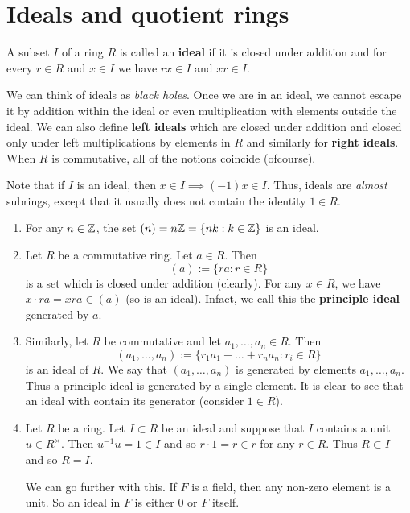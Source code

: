 \chapter{Ideals and quotient rings}

\begin{definition}[Ideal]
    A subset $I$ of a ring $R$ is called an \textbf{ideal} if it is closed under addition and for every $r \in R$ and $x \in I$ we have $rx \in I$ and $xr \in I$.
\end{definition}

We can think of ideals as \emph{black holes}. Once we are in an ideal, we cannot escape it by addition within the ideal or even multiplication with elements outside the ideal. We can also define \textbf{left ideals} which are closed under addition and closed only under left multiplications by elements in $R$ and similarly for \textbf{right ideals}. When $R$ is commutative, all of the notions coincide (ofcourse). 

\begin{remark}
    Note that if $I$ is an ideal, then $x \in I \implies (-1)x \in I$. Thus, ideals are \emph{almost} subrings, except that it usually does not contain the identity $1 \in R$.
\end{remark}

\begin{example}
    \begin{enumerate}
        \item For any $n \in \mathbb{Z}$, the set $(n) = n\mathbb{Z} = \{nk : k \in \mathbb{Z}\}$ is an ideal.

        \item Let $R$ be a commutative ring. Let $a \in R$. Then
            \[ (a) := \{ra : r \in R\} \]
            is a set which is closed under addition (clearly). For any $x \in R$, we have $x \cdot ra = xra \in (a)$ (so is an ideal). Infact, we call this the \textbf{principle ideal} generated by $a$.

        \item Similarly, let $R$ be commutative and let $a_1, \ldots, a_n \in R$. Then 
            \[ (a_1, \ldots, a_n) := \{ r_1a_1 + \ldots + r_na_n : r_i \in R \} \]
            is an ideal of $R$. We say that $(a_1, \ldots, a_n)$ is generated by elements $a_1, \ldots, a_n$. Thus a principle ideal is generated by a single element. It is clear to see that an ideal with contain its generator (consider $1 \in R$).

        \item Let $R$ be a ring. Let $I \subset R$ be an ideal and suppose that $I$ contains a unit $u \in R^\times$. Then $u^{-1} u = 1 \in I$ and so $r \cdot 1 = r \in r$ for any $r \in R$. Thus $R \subset I$ and so $R = I$.
            
            We can go further with this. If $F$ is a field, then any non-zero element is a unit. So an ideal in $F$ is either $0$ or $F$ itself. 
    \end{enumerate}
\end{example}

